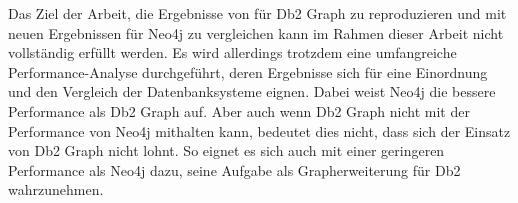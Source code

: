 Das Ziel der Arbeit, die Ergebnisse von  für Db2 Graph zu reproduzieren und mit neuen Ergebnissen für Neo4j zu vergleichen kann im Rahmen dieser Arbeit nicht vollständig erfüllt werden. Es wird allerdings trotzdem eine umfangreiche Performance-Analyse durchgeführt, deren Ergebnisse sich für eine Einordnung und den Vergleich der Datenbanksysteme eignen. Dabei weist Neo4j die bessere Performance als Db2 Graph auf. Aber auch wenn Db2 Graph nicht mit der Performance von Neo4j mithalten kann, bedeutet dies nicht, dass sich der Einsatz von Db2 Graph nicht lohnt. So eignet es sich auch mit einer geringeren Performance als Neo4j dazu, seine Aufgabe als Grapherweiterung für Db2 wahrzunehmen.